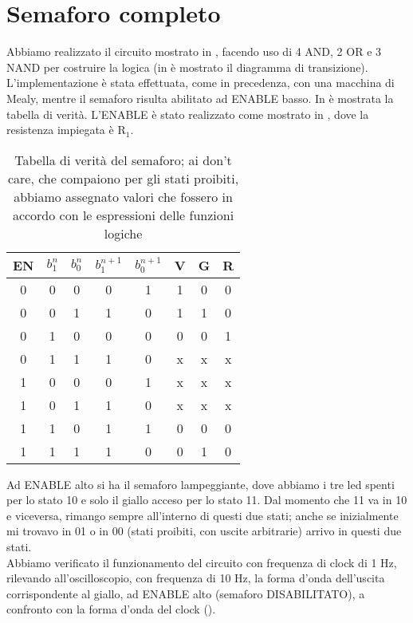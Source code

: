 \section{Semaforo completo}
Abbiamo realizzato il circuito mostrato in , facendo uso di 4 AND, 2 OR e 3 NAND per costruire la logica (in  è mostrato il diagramma di transizione). L'implementazione è stata effettuata, come in precedenza, con una macchina di Mealy, mentre il semaforo risulta abilitato ad ENABLE basso. In  è mostrata la tabella di verità. L'ENABLE è stato realizzato come mostrato in , dove la resistenza impiegata è R$_1$.\\
\begin{table}[h]
	\centering
	\begin{tabular}{cccccccc}		
		 EN& $b_{1}^{n}$& $b_{0}^{n}$& $b_{1}^{n+1}$& $b_{0}^{n+1}$ &V & G& R\\
		 \midrule 
		  0 & 0 & 0 & 0 & 1 & 1 & 0 & 0 \\
		  0 & 0 & 1 & 1 & 0 & 1 & 1 & 0 \\
		  0 & 1 & 0 & 0 & 0 & 0 & 0 & 1 \\
          0 & 1 & 1 & 1 & 0 & x & x & x \\
		  1 & 0 & 0 & 0 & 1 & x & x & x \\
		  1 & 0 & 1 & 1 & 0 & x & x & x \\
		  1 & 1 & 0 & 1 & 1 & 0 & 0 & 0 \\
          1 & 1 & 1 & 1 & 0 & 0 & 1 & 0 \\          
 	\end{tabular}
	\caption{ Tabella di verità del semaforo; ai don't care, che compaiono per gli stati proibiti, abbiamo assegnato valori che fossero in accordo con le espressioni delle funzioni logiche }
	\label{t:tabella_verità}
\end{table}
Ad ENABLE alto si ha il semaforo lampeggiante, dove abbiamo i tre led spenti per lo stato 10 e solo il giallo acceso per lo stato 11. Dal momento che 11 va in 10 e viceversa, rimango sempre all'interno di questi due stati; anche se inizialmente mi trovavo in 01 o in 00 (stati proibiti, con uscite arbitrarie) arrivo in questi due stati.\\
Abbiamo verificato il funzionamento del circuito con frequenza di clock di 1 Hz, rilevando all'oscilloscopio, con frequenza di 10 Hz, la forma d'onda dell'uscita corrispondente al giallo, ad ENABLE alto (semaforo DISABILITATO), a confronto con la forma d'onda del clock ().\\
